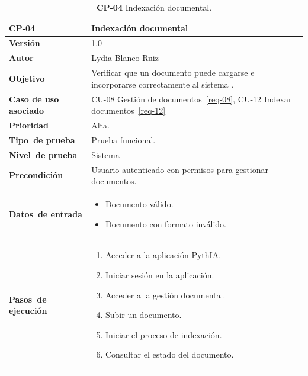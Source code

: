 \begin{table}[p]
	\centering
	\begin{tabularx}{\linewidth}{ p{} p{} }
		\toprule
		\textbf{CP-04}    & \textbf{Indexación documental}\\
		\toprule
		\textbf{Versión}              & 1.0    \\
		\textbf{Autor}                & Lydia Blanco Ruiz \\
		\textbf{Objetivo}			 & Verificar que un documento puede cargarse e incorporarse correctamente al sistema \eng{RAG}.\\
		\textbf{Caso de uso asociado} &  CU-08 Gestión de documentos~\ref{req-08}, CU-12 Indexar documentos~\ref{req-12}\\
		\textbf{Prioridad}          & Alta. \\
		\textbf{\mbox{Tipo de} \mbox{prueba}}         & Prueba funcional. \\
		\textbf{\mbox{Nivel de} \mbox{prueba}}        & Sistema\\
		\textbf{Precondición}        & Usuario autenticado con permisos para gestionar documentos. \\
		\textbf{\mbox{Datos de} \mbox{entrada}} 		& 
		\begin{itemize}
		\tightlist
			\item Documento \file{PDF} válido.
			\item Documento con formato inválido.
		\end{itemize}				
		\\
		\textbf{\mbox{Pasos de} \mbox{ejecución}}		&
		\begin{enumerate}
		\tightlist
			\item Acceder a la aplicación \eng{web} PythIA.
			\item Iniciar sesión en la aplicación.
			\item Acceder a la gestión documental.
			\item Subir un documento.
			\item Iniciar el proceso de indexación.
			\item Consultar el estado del documento.
		\end{enumerate} \\
		\bottomrule
	\end{tabularx}
	\caption{\textbf{CP-04} Indexación documental.}
	\label{prueb-04}
\end{table}


